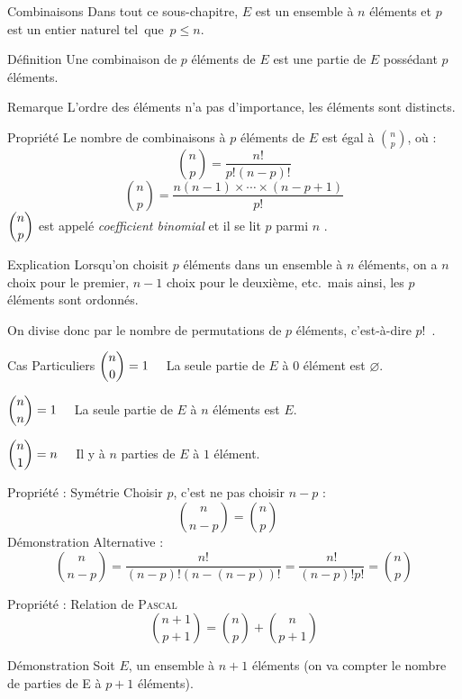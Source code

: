 \documentclass{cours}
\begin{document}
    \begin{Gpartie}{Combinaisons}
        Dans tout ce sous-chapitre, $E$ est un ensemble à $n$ éléments et $p$ est un entier naturel tel~que~$p\leq n$.
        \begin{Spartie}{Définition}
            Une combinaison de $p$ éléments de $E$ est une partie de $E$ possédant $p$ éléments.
            \begin{SSpartie}{Remarque}
                L'ordre des éléments n'a pas d'importance, les éléments sont distincts.
            \end{SSpartie}
        \end{Spartie}
        \begin{Spartie}{Propriété}
            Le nombre de combinaisons à $p$ éléments de $E$ est égal à $\binom{n}{p}$, où :
            \[\binom{n}{p}=\dfrac{n!}{p!(n-p)!}\]
            \[\binom{n}{p}=\dfrac{n(n-1)\times\dotsb\times(n-p+1)}{p!}\]
            $\dbinom{n}{p}$ est appelé \emph{coefficient binomial} et il se lit \og $p$ parmi $n$ \fg{}.
            \begin{SSpartie}{Explication}
                Lorsqu'on choisit $p$ éléments dans un ensemble à $n$ éléments, on a $n$ choix pour le premier, $n-1$ choix pour le deuxième, etc.\ mais ainsi, les $p$ éléments sont ordonnés.

                On divise donc par le nombre de permutations de $p$ éléments, c'est-à-dire $p!$~.
            \end{SSpartie}
            \begin{SSpartie}{Cas Particuliers}
                $\dbinom{n}{0}=1\quad$ La seule partie de $E$ à $0$ élément est $\varnothing$.

                $\dbinom{n}{n}=1\quad$ La seule partie de $E$ à $n$ éléments est $E$.

                $\dbinom{n}{1}=n\quad$ Il y à $n$ parties de $E$ à $1$ élément.
            \end{SSpartie}
        \end{Spartie}
        \begin{Spartie}{Propriété : Symétrie}
            Choisir $p$, c'est ne pas choisir $n-p$ :
            \[\binom{n}{n-p}=\binom{n}{p}\quad\]
            Démonstration Alternative : 
            \[\binom{n}{n-p}=\dfrac{n!}{(n-p)!(n-(n-p))!}=\dfrac{n!}{(n-p)!p!}=\binom{n}{p}\]
        \end{Spartie}
        \begin{Spartie}{Propriété : Relation de \textsc{Pascal}}
            \[\binom{n+1}{p+1}=\binom{n}{p}+\binom{n}{p+1}\]
            \begin{SSpartie}{Démonstration}
                Soit $E$, un ensemble à $n+1$ éléments (on va compter le nombre de parties de E à $p+1$ éléments).


\end{SSpartie}
\end{Spartie}
\end{Gpartie}
\end{document}
